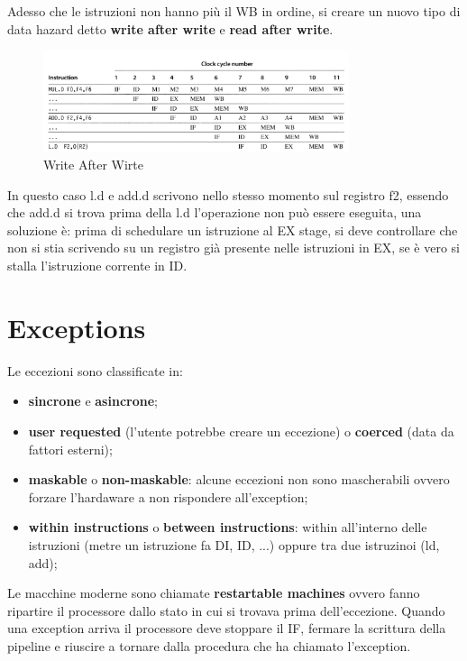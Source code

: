 \documentclass[12pt]{article}
\begin{document}
Adesso che le istruzioni non hanno pi\`u il WB in ordine, si creare un nuovo tipo di data hazard detto \textbf{write after write} e \textbf{read after write}.
\begin{figure}[H]
    \centering
    \includegraphics[width=0.8\textwidth]{write-after-wirte.png}
    \caption{Write After Wirte}
    \label{fig:write-after-wirte}
\end{figure}
In questo caso l.d e add.d scrivono nello stesso momento sul registro f2, essendo che add.d si trova prima della l.d l'operazione non pu\`o essere eseguita, una soluzione \`e: prima di schedulare un istruzione al EX stage, si deve controllare che non si stia scrivendo su un registro gi\`a presente nelle istruzioni in EX, se \`e vero si stalla l'istruzione corrente in ID.



\section{Exceptions}
Le eccezioni sono classificate in:
\begin{itemize}
    \item \textbf{sincrone} e \textbf{asincrone};
    \item \textbf{user requested} (l'utente potrebbe creare un eccezione) o \textbf{coerced} (data da fattori esterni);
    \item \textbf{maskable} o \textbf{non-maskable}: alcune eccezioni non sono mascherabili ovvero forzare l'hardaware a non rispondere all'exception;
    \item \textbf{within instructions} o \textbf{between instructions}: within all'interno delle istruzioni (metre un istruzione fa DI, ID, ...) oppure tra due istruzinoi (ld, add);
\end{itemize}
Le macchine moderne sono chiamate \textbf{restartable machines} ovvero fanno ripartire il processore dallo stato in cui si trovava prima dell'eccezione. Quando una exception arriva il processore deve stoppare il IF, fermare la scrittura della pipeline e riuscire a tornare dalla procedura che ha chiamato l'exception.
\end{document}
